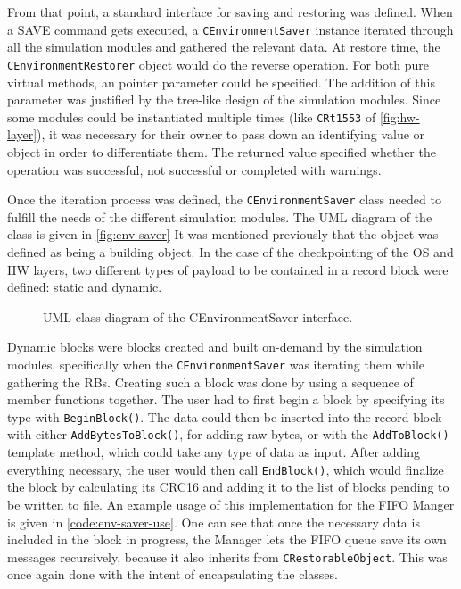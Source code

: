 {From that point, a standard interface for saving and restoring was defined. When a SAVE command gets executed, a \texttt{CEnvironmentSaver} instance iterated through all the simulation modules and gathered the relevant data. At restore time, the \texttt{CEnvironmentRestorer} object would do the reverse operation. For both pure virtual methods, an pointer parameter could be specified. The addition of this parameter was justified by the tree-like design of the simulation modules. Since some modules could be instantiated multiple times (like \texttt{CRt1553} of \autoref{fig:hw-layer}), it was necessary for their owner to pass down an identifying value or object in order to differentiate them. The returned value specified whether the operation was successful, not successful or completed with warnings. 

Once the iteration process was defined, the \texttt{CEnvironmentSaver} class needed to fulfill the needs of the different simulation modules. The UML diagram of the class is given in \autoref{fig:env-saver} It was mentioned previously that the object was defined as being a building object. In the case of the checkpointing of the OS and HW layers, two different types of payload to be contained in a record block were defined: static and dynamic. 

\begin{figure}[htbp]
	\vspace{12pt}
	\centering
	\footnotesize
	
	\caption{UML class diagram of the CEnvironmentSaver interface.}
	\label{fig:env-saver}
\end{figure}


Dynamic blocks were blocks created and built on-demand by the simulation modules, specifically when the \texttt{CEnvironmentSaver} was iterating them while gathering the RBs. Creating such a block was done by using a sequence of member functions together. The user had to first begin a block by specifying its type with \texttt{BeginBlock()}. The data could then be inserted into the record block with either \texttt{AddBytesToBlock()}, for adding raw bytes, or with the \texttt{AddToBlock()} template method, which could take any type of data as input. After adding everything necessary, the user would then call \texttt{EndBlock()}, which would finalize the block by calculating its CRC16 and adding it to the list of blocks pending to be written to file. An example usage of this implementation for the FIFO Manger is given in \autoref{code:env-saver-use}. One can see that once the necessary data is included in the block in progress, the Manager lets the FIFO queue save its own messages recursively, because it also inherits from \texttt{CRestorableObject}. This was once again done with the intent of encapsulating the classes.

}
